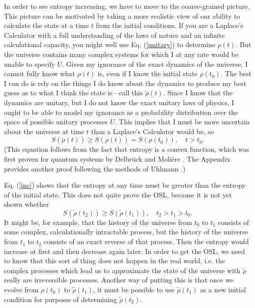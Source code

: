 \documentclass{article}
\begin{document}
In order to see entropy increasing, we have to move to the coarse-grained picture.  This picture can be motivated by taking a more realistic view of our ability to calculate the state at a time $t$ from the initial conditions.  If you are a Laplace's Calculator with a full understanding of the laws of nature and an infinite calculational capacity, you might well use Eq. (\ref{unitary}) to determine $\rho(t)$.  But the universe contains many complex systems for which I at any rate would be unable to specify $U$.  Given my ignorance of the exact dynamics of the universe, I cannot fully know what $\rho(t)$ is, even if I know the initial state $\rho(t_0)$.  The best I can do is rely on the things I do know about the dynamics to produce my best guess as to what I think the state is---call this $\tilde{\rho}(t)$.  Since I know that the dynamics are unitary, but I do not know the exact unitary laws of physics, I ought to be able to model my ignorance as a probability distribution over the space of possible unitary processes $U$.  This implies that I must be more uncertain about the universe at time $t$ than a Laplace's Calculator would be, so 
\begin{equation}\label{inc}
S(\tilde{\rho}(t)) \ge S(\rho(t)) = S(\rho(t_0)), \quad t > t_0.
\end{equation}
(This equation follows from the fact that entropy is a convex function, which was first proven for quantum systems by Delbr\"uck and Moli\`ere \cite{convex}.  The Appendix provides another proof following the methods of Uhlmann \cite{Uhlmann}.)

Eq. (\ref{inc}) shows that the entropy at any time must be greater than the entropy of the initial state.  This does not quite prove the OSL, because it is not yet shown whether
\begin{equation}
S(\tilde{\rho}(t_2)) \ge S(\tilde{\rho}(t_1)), \quad t_2 > t_1 > t_0.
\end{equation}
It might be, for example, that the history of the universe from $t_0$ to $t_1$ consists of some complex, calculationally intractable process, but the history of the universe from $t_1$ to $t_2$ consists of an exact reverse of that process.  Then the entropy would increase at first and then decrease again later.  In order to get the OSL, we need to know that this sort of thing does not happen in the real world, i.e. the complex processes which lead us to approximate the state of the universe with $\tilde{\rho}$ really are irreversible processes.  Another way of putting this is that once we evolve from $\rho(t_0)$ to $\tilde{\rho}(t_1)$, it must be possible to use $\tilde{\rho}(t_1)$ as a new initial condition for purposes of determining $\tilde{\rho}(t_2)$.
\end{document}
